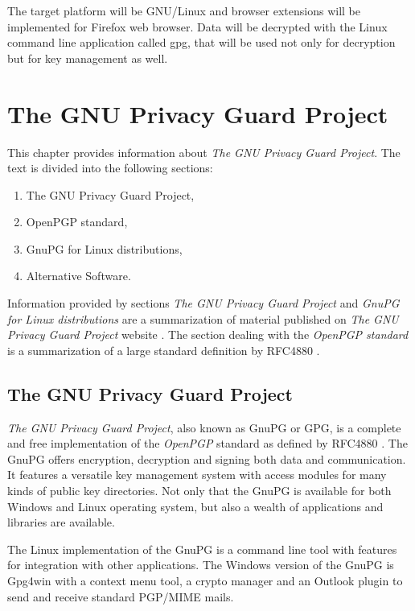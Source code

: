 The target platform will be GNU/Linux and browser extensions will be implemented for Firefox web browser. Data will be decrypted with the Linux command line application called gpg, that will be used not only for decryption but for key management as well.

\chapter{The GNU Privacy Guard Project}
This chapter provides information about \textit{The GNU Privacy Guard Project}. The text is divided into the following sections:
\begin{enumerate}
    \item The GNU Privacy Guard Project,
    \item OpenPGP standard,
    \item GnuPG for Linux distributions,
    \item Alternative Software.
\end{enumerate}

Information provided by sections \textit{The GNU Privacy Guard Project} and \textit{GnuPG for Linux distributions} are a summarization of material published on \textit{The GNU Privacy Guard Project} website \cite{GnuPG}. The section dealing with the \textit{OpenPGP standard} is a summarization of a large standard definition by RFC4880 \cite{RFC4880}.

\section{The GNU Privacy Guard Project}
\textit{The GNU Privacy Guard Project}, also known as GnuPG or GPG, is a complete and free implementation of the \textit{OpenPGP} standard as defined by RFC4880 \cite{RFC4880}. The GnuPG offers encryption, decryption and signing both data and communication. It features a versatile key management system with access modules for many kinds of public key directories. Not only that the GnuPG is available for both Windows and Linux operating system, but also a wealth of applications and libraries are available.

The Linux implementation of the GnuPG is a command line tool with features for integration with other applications. The Windows version of the GnuPG is Gpg4win with a context menu tool, a crypto manager and an Outlook plugin to send and receive standard PGP/MIME mails.

